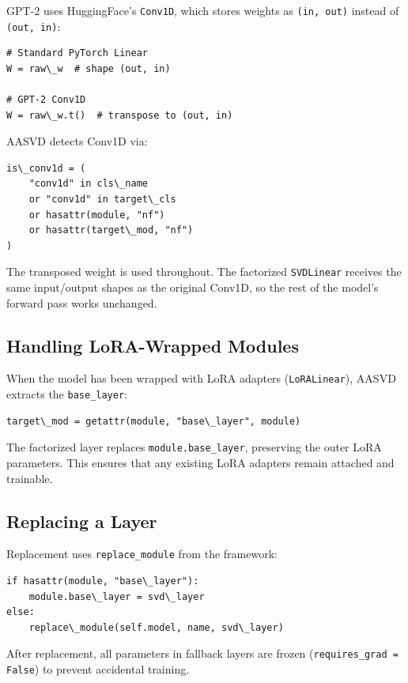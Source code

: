 GPT-2 uses HuggingFace's \texttt{Conv1D}, which stores weights as \texttt{(in, out)} 
instead of \texttt{(out, in)}:

\begin{lstlisting}
# Standard PyTorch Linear
W = raw\_w  # shape (out, in)

# GPT-2 Conv1D
W = raw\_w.t()  # transpose to (out, in)
\end{lstlisting}

AASVD detects Conv1D via:

\begin{lstlisting}
is\_conv1d = (
    "conv1d" in cls\_name 
    or "conv1d" in target\_cls 
    or hasattr(module, "nf") 
    or hasattr(target\_mod, "nf")
)
\end{lstlisting}

The transposed weight is used throughout. The factorized \texttt{SVDLinear} 
receives the same input/output shapes as the original Conv1D, so the 
rest of the model's forward pass works unchanged.

\subsection{Handling LoRA-Wrapped Modules}

When the model has been wrapped with LoRA adapters (\texttt{LoRALinear}), AASVD 
extracts the \texttt{base\_layer}:

\begin{lstlisting}
target\_mod = getattr(module, "base\_layer", module)
\end{lstlisting}

The factorized layer replaces \texttt{module.base\_layer}, preserving the outer 
LoRA parameters. This ensures that any existing LoRA adapters remain 
attached and trainable.

\subsection{Replacing a Layer}

Replacement uses \texttt{replace\_module} from the framework:

\begin{lstlisting}
if hasattr(module, "base\_layer"):
    module.base\_layer = svd\_layer
else:
    replace\_module(self.model, name, svd\_layer)
\end{lstlisting}

After replacement, all parameters in fallback layers are frozen 
(\texttt{requires\_grad = False}) to prevent accidental training.

